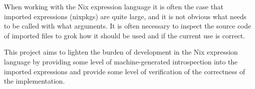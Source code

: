 \documentclass[12pt]{article}
\begin{document}
When working with the Nix expression language it is often the case that imported expressions (nixpkgs) are quite large, and it is not obvious what needs to be called with what arguments. It is often necessary to inspect the source code of imported files to grok how it should be used and if the current use is correct.

This project aims to lighten the burden of development in the Nix expression language by providing some level of machine-generated introspection into the imported expressions and provide some level of verification of the correctness of the implementation.
\end{document}
